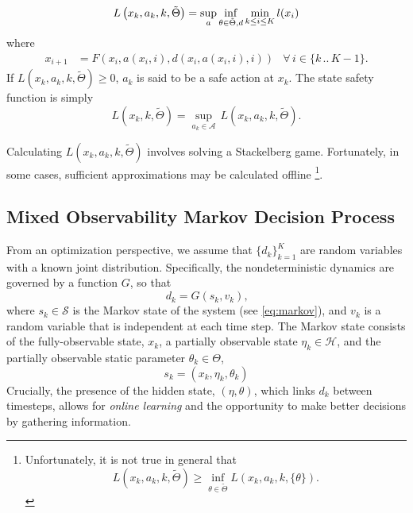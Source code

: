 \documentclass{article}
\newcommand{\sspace}{\ensuremath{\mathcal{S}} }
\newcommand{\aspace}{\ensuremath{\mathcal{A}} }
\newcommand{\hstate}{\eta}
\newcommand{\hsspace}{\mathcal{H}}
\newcommand{\dstate}{\theta}
\newcommand{\dsspace}{\Theta}
\begin{document}
\begin{equation}
    L\left(x_k, a_k, k, \tilde{\dsspace}\right) = \underset{a}{\sup}\,\underset{\dstate \in \tilde{\dsspace}, d}{\inf}\,\underset{k\leq i\leq K}{\min}\,l(x_i) \\
\end{equation}
where
\begin{equation*}
    \begin{aligned}
        x_{i+1} &= F(x_i, a(x_i, i), d(x_i, a(x_i, i), i)) & \forall\, i \in \{k\,..\,K-1\} \text{.}
    \end{aligned}
\end{equation*}
If $L\left(x_k, a_k, k, \tilde{\dsspace} \right) \geq 0$, $a_k$ is said to be a safe action at $x_k$. The state safety function is simply
\begin{equation}
    L\left(x_k, k, \tilde{\dsspace} \right) = \underset{a_k\in\aspace}{\sup}\,L\left(x_k,a_k,k, \tilde{\dsspace}\right) \text{.}
\end{equation}

Calculating $L\left(x_k,a_k,k,\tilde{\dsspace}\right)$ involves solving a Stackelberg game. Fortunately, in some cases, sufficient approximations may be calculated offline%
\footnote{
Unfortunately, it is not true in general that
\[ L\left(x_k, a_k, k, \tilde{\dsspace} \right) \geq \inf_{\dstate \in \tilde{\dsspace}} L\left(x_k, a_k, k, \{\dstate\} \right)\text{.}\]
}.

\subsection{Mixed Observability Markov Decision Process} \label{sec:momdp}

From an optimization perspective, we assume that $\{d_k\}_{k=1}^K$ are random variables with a known joint distribution. Specifically, the nondeterministic dynamics are governed by a function $G$, so that
\begin{equation}
    d_k = G(s_k, v_k) \text{,}
\end{equation}
where $s_k \in \sspace$ is the Markov state of the system (see \cref{eq:markov}), and $v_k$ is a random variable that is independent at each time step.
The Markov state consists of the fully-observable state, $x_k$, a partially observable state $\hstate_k \in \hsspace$, and the partially observable static parameter $\dstate_k \in \dsspace$, 
\begin{equation} \label{eq:markov}
    s_k = (x_k, \hstate_k, \dstate_k)
\end{equation}
Crucially, the presence of the hidden state, $(\hstate, \dstate)$, which links $d_k$ between timesteps, allows for \emph{online learning} and the opportunity to make better decisions by gathering information.
\end{document}
